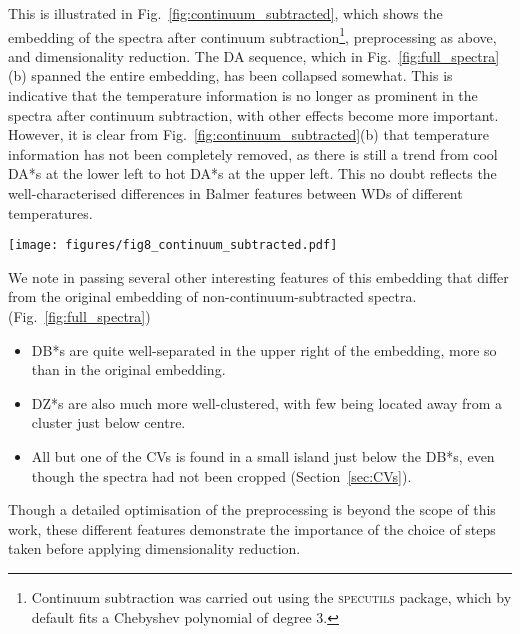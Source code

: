 \documentclass[fleqn,usenatbib]{mnras}
\def\Teff{T_\mathrm{eff}}
\begin{document}
This is illustrated in Fig.~\ref{fig:continuum_subtracted}, which shows the embedding of the spectra after continuum subtraction\footnote{
    Continuum subtraction was carried out using the \textsc{specutils} package, which by default fits a Chebyshev polynomial of degree 3.
}, preprocessing as above, and dimensionality reduction.
The DA sequence, which in Fig.~\ref{fig:full_spectra}(b) spanned the entire embedding, has been collapsed somewhat.
This is indicative that the temperature information is no longer as prominent in the spectra after continuum subtraction, with other effects become more important.
However, it is clear from Fig.~\ref{fig:continuum_subtracted}(b) that temperature information has not been completely removed, as there is still a trend from cool DA*s at the lower left to hot DA*s at the upper left.
This no doubt reflects the well-characterised differences in Balmer features between WDs of different temperatures.

\begin{figure*}
\texttt{[image: figures/fig8\_continuum\_subtracted.pdf]}
\caption{
    Dimensionality-reduced embedding of spectra following continuum subtraction.
    (a) Colour-coded according to the visual classification of \citet{manser24}, as in Fig.~\ref{fig:full_spectra}(b).
    The DA sequence has partially collapsed, but not entirely.
    (b) Colour-coded according to $\Teff$, as in Fig.~\ref{fig:full_spectra}(c).
    There is still a temperature trend along the shorter DA sequence.
}
\label{fig:continuum_subtracted}
\end{figure*}

We note in passing several other interesting features of this embedding that differ from the original embedding of non-continuum-subtracted spectra.(Fig.~\ref{fig:full_spectra})
\begin{itemize}
\item
DB*s are quite well-separated in the upper right of the embedding, more so than in the original embedding.
\item
DZ*s are also much more well-clustered, with few being located away from a cluster just below centre.
\item
All but one of the CVs is found in a small island just below the DB*s, even though the spectra had not been cropped (Section~\ref{sec:CVs}).
\end{itemize}
Though a detailed optimisation of the preprocessing is beyond the scope of this work, these different features demonstrate the importance of the choice of steps taken before applying dimensionality reduction.
\end{document}
